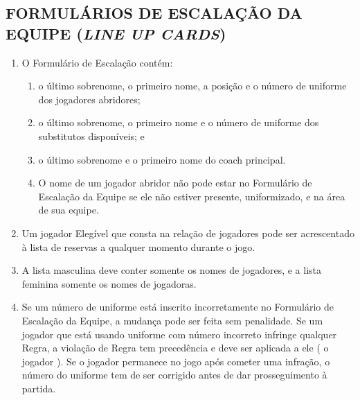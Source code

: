 \subsection{FORMULÁRIOS DE ESCALAÇÃO DA EQUIPE (\textit{LINE UP CARDS})}
\begin{enumerate}[label=(\alph*)]\item   O Formulário de Escalação contém:
  \begin{enumerate}[label=\roman*.]
 	\item o último sobrenome, o primeiro nome, a posição e o número de uniforme dos jogadores abridores;
	\item  o último sobrenome, o primeiro nome e o número de uniforme dos substitutos disponíveis; e
	\item  o último sobrenome e o primeiro nome do \gls{coach} principal.
	\item  O nome de um jogador abridor não pode estar no Formulário de Escalação da Equipe se ele não estiver presente, uniformizado, e na área de sua equipe.
 \end{enumerate}
\item  Um jogador Elegível que consta na relação de jogadores pode ser acrescentado à lista de reservas a qualquer momento durante o jogo.
\item  A lista masculina deve conter somente os nomes de jogadores, e a lista  feminina somente os nomes de jogadoras.
\item  Se um número de uniforme está inscrito incorretamente no Formulário de Escalação da Equipe, a mudança pode ser feita sem penalidade. Se um jogador que está usando uniforme com número incorreto infringe qualquer Regra, a  violação de Regra tem precedência e deve ser aplicada a ele ( o jogador ). Se o jogador permanece no jogo após cometer uma infração, o número do uniforme tem de ser corrigido antes de dar prosseguimento à partida.

\end{enumerate}


